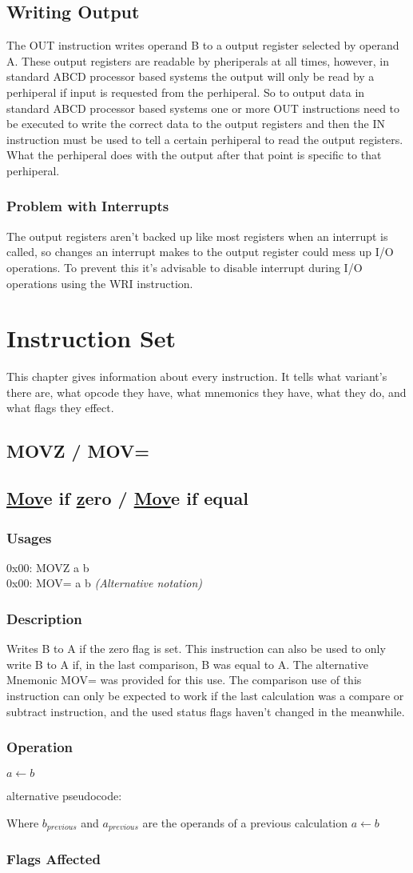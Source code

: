 \documentclass[oneside, a4paper]{memoir}
\newcommand{\instruction}[6]{
\section{#1}
\section*{#2}
\subsection*{Usages}
#3
\subsection*{Description}
#4
\subsection*{Operation}
#5
\subsection*{Flags Affected}
\ifthenelse{\equal{#6}{}}{none}{#6}
\clearpage
}
\begin{document}
\section{Writing Output}
The OUT instruction writes operand B to a output register selected by operand A. These output registers are readable by pheriperals at all times, however, in standard ABCD processor based systems the output will only be read by a perhiperal if input is requested from the perhiperal. So to output data in standard ABCD processor based systems one or more OUT instructions need to be executed to write the correct data to the output registers and then the IN instruction must be used to tell a certain perhiperal to read the output registers. What the perhiperal does with the output after that point is specific to that perhiperal.
\subsection{Problem with Interrupts}
The output registers aren't backed up like most registers when an interrupt is called, so changes an interrupt makes to the output register could mess up I/O operations. To prevent this it's advisable to disable interrupt during I/O operations using the WRI instruction.

\chapter{Instruction Set}
\label{ch:Instruction Set}
This chapter gives information about every instruction. It tells what variant's there are, what opcode they have, what mnemonics they have, what they do, and what flags they effect.
\clearpage

\instruction{MOVZ / MOV=}{\underline{Mov}e if \underline{z}ero / \underline{Mov}e if equal}{
0x00: MOVZ a b \\
0x00: MOV= a b \emph{(Alternative notation)}
}{
Writes B to A if the zero flag is set. This instruction can also be used to only write B to A if, in the last comparison, B was equal to A. The alternative Mnemonic MOV= was provided for this use. The comparison use of this instruction can only be expected to work if the last calculation was a compare or subtract instruction, and the used status flags haven't changed in the meanwhile.
}{
\begin{algorithmic}
\If {$Z$}
    \State $a\gets b$
\EndIf
\end{algorithmic}
alternative pseudocode:
\begin{algorithmic}
\If {$b_{previous} = a_{previous}$} \Comment Where $b_{previous}$ and $a_{previous}$ are the operands of a previous calculation
    \State $a\gets b$
\EndIf
\end{algorithmic}
}{}
\end{document}
